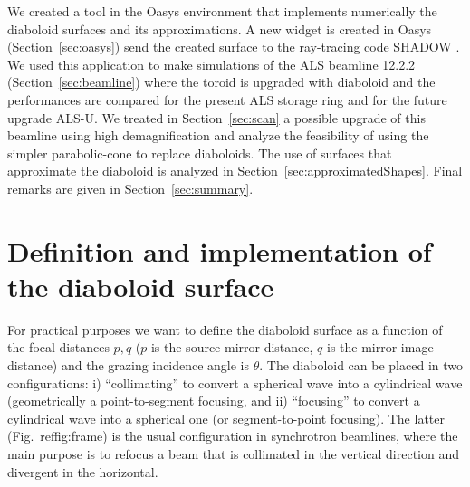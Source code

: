 \documentclass{iucr}              %
\begin{document}
We created a tool in the Oasys environment \cite{codeOASYS} that implements numerically the diaboloid surfaces and its approximations. A new widget is created in Oasys (Section~\ref{sec:oasys}) send the created surface to the ray-tracing code SHADOW \cite{codeSHADOW}. We used this application to make simulations of the ALS beamline 12.2.2 (Section~\ref{sec:beamline}) where the toroid is upgraded with diaboloid and the performances are compared for the present ALS storage ring and for the future upgrade ALS-U. We treated in Section~\ref{sec:scan} a possible upgrade of this beamline using high demagnification and analyze the feasibility of using the simpler parabolic-cone to replace diaboloids. The use of surfaces that approximate the diaboloid is analyzed in Section~\ref{sec:approximatedShapes}. Final remarks are given in Section~\ref{sec:summary}.


\section{Definition and implementation of the diaboloid surface}
\label{sec:DiaboloidEqs}

For practical purposes we want to define the diaboloid surface as a function of the focal distances $p,q$ ($p$ is the source-mirror distance, $q$ is the mirror-image distance) and the grazing incidence angle is $\theta$. The diaboloid can be placed in two configurations: i) ``collimating'' to convert a spherical wave into a cylindrical wave (geometrically a point-to-segment focusing, and ii) ``focusing'' to convert a cylindrical wave into a spherical one (or segment-to-point focusing). The latter (Fig.~ref{fig:frame}) is the usual configuration in synchrotron beamlines, where the main purpose is to refocus a beam that is collimated in the vertical direction and divergent in the horizontal. 


\end{document}
